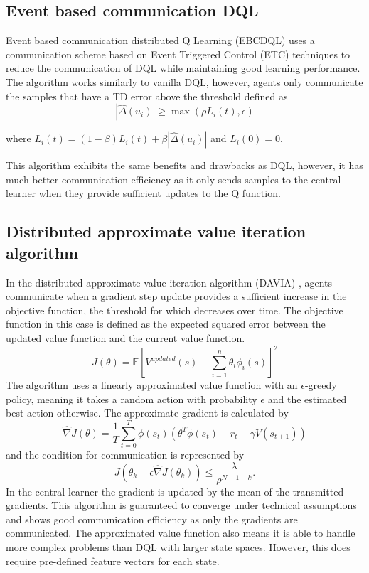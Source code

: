 \subsection{Event based communication DQL}
Event based communication distributed Q Learning (EBCDQL) \cite{EBCDQL} uses a communication scheme based on Event Triggered Control (ETC) techniques to reduce the communication of DQL while maintaining good learning performance.
The algorithm works similarly to vanilla DQL, however, agents only communicate the samples that have a TD error above the threshold defined as 
\begin{equation*}
    |\hat{\Delta}(u_i)| \geq \max(\rho L_i(t), \epsilon) 
\end{equation*}

where $L_i(t) = (1-\beta)L_i(t)+ \beta |\hat{\Delta}(u_i)|$ and $L_i(0)=0$.

This algorithm exhibits the same benefits and drawbacks as DQL, however, it has much better communication efficiency as it only sends samples to the central learner when they provide sufficient updates to the Q function.

\subsection{Distributed approximate value iteration algorithm}
In the distributed approximate value iteration algorithm (DAVIA) \cite{DAVIA}, agents communicate when a gradient step update provides a sufficient increase in the objective function, the threshold for which decreases over time. The objective function in this case is defined as the expected squared error between the updated value function and the current value function. 
\begin{equation*}
    J(\theta) = \mathbb{E}[V^{updated}(s) - \sum_{i=1}^n \theta_i \phi_i(s)]^2
\end{equation*} 
The algorithm uses a linearly approximated value function with an $\epsilon$-greedy policy, meaning it takes a random action with probability $\epsilon$ and the estimated best action otherwise.
The approximate gradient is calculated by
\begin{equation*}
    \hat{\nabla}J(\theta) = \frac{1}{T} \sum^T_{t=0} \phi(s_t)(\theta^T \phi(s_t) - r_t - \gamma V(s_{t+1}))
\end{equation*}
and the condition for communication is represented by 
\begin{equation*}
    J(\theta_k - \epsilon \hat{\nabla}J(\theta_k)) \leq \frac{\lambda}{\rho^{N-1-k}}.
\end{equation*}
In the central learner the gradient is updated by the mean of the transmitted gradients. This algorithm is guaranteed to converge under technical assumptions and shows good communication efficiency as only the gradients are communicated. The approximated value function also means it is able to handle more complex problems than DQL with larger state spaces. However, this does require pre-defined feature vectors for each state.

